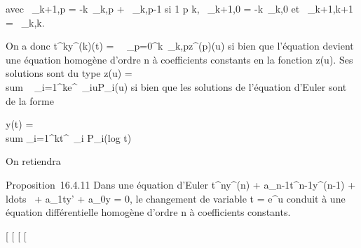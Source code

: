 \documentclass[]{article}
\begin{document}
avec \lambda~\_k+1,p = -k\lambda~\_k,p + \lambda~\_k,p-1 si 1 \leq p \leq
k, \lambda~\_k+1,0 = -k\lambda~\_k,0 et \lambda~\_k+1,k+1 =
\lambda~\_k,k.

On a donc t^ky^(k)(t) =\
\sum ~
\_p=0^k\lambda~\_k,pz^(p)(u) si bien que
l'équation devient une équation homogène d'ordre n à coefficients
constants en la fonction z(u). Ses solutions sont du type z(u)
= \\sum ~
\_i=1^ke^\lambda~\_iuP\_i(u) si bien
que les solutions de l'équation d'Euler sont de la forme

y(t) = \\sum
\_i=1^kt^\lambda~\_i P\_i(log t)

On retiendra

Proposition~16.4.11 Dans une équation d'Euler
t^ny^(n) +
a\_n-1t^n-1y^(n-1) +
\\ldots~ +
a\_1ty' + a\_0y = 0, le changement de variable t =
e^u conduit à une équation différentielle homogène d'ordre n
à coefficients constants.

{[}
{[}
{[}
{[}
\end{document}
